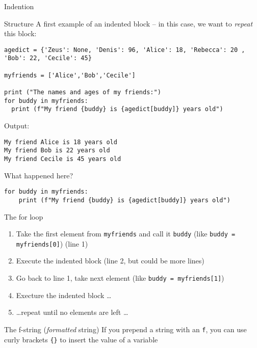 \documentclass{beamer}
\begin{document}
\begin{frame}[fragile]{Indention}
\begin{block}{Structure}
	A first example of an indented block -- in this case, we want to \emph{repeat} this block:
\end{block}
\begin{lstlisting}
agedict = {'Zeus': None, 'Denis': 96, 'Alice': 18, 'Rebecca': 20 , 'Bob': 22, 'Cecile': 45}

myfriends = ['Alice','Bob','Cecile']

print ("The names and ages of my friends:")
for buddy in myfriends:
  print (f"My friend {buddy} is {agedict[buddy]} years old")
\end{lstlisting}

Output:
\begin{lstlisting}
My friend Alice is 18 years old
My friend Bob is 22 years old
My friend Cecile is 45 years old
\end{lstlisting}
\end{frame}

\begin{frame}[fragile]{What happened here?}

\begin{lstlisting}
for buddy in myfriends:
    print (f"My friend {buddy} is {agedict[buddy]} years old")
\end{lstlisting}

\small
\begin{block}{The for loop}
	\begin{enumerate}
		\item Take the first element from \texttt{myfriends} and call it \texttt{buddy} (like \texttt{buddy = myfriends[0]}) (line 1)
		\item Execute the indented block (line 2, but could be more lines)
		\item Go back to line 1, take next element  (like \texttt{buddy = myfriends[1]}) 
		\item Execture the indented block \ldots
		\item \ldots repeat until no elements are left \ldots
	\end{enumerate}
\end{block}

\begin{block}{The f-string (\emph{formatted} string)}
	If you prepend a string with an \texttt{f}, you can use curly brackets \texttt{\{\}} to insert the value of a variable
\end{block}

\end{frame}
\end{document}
